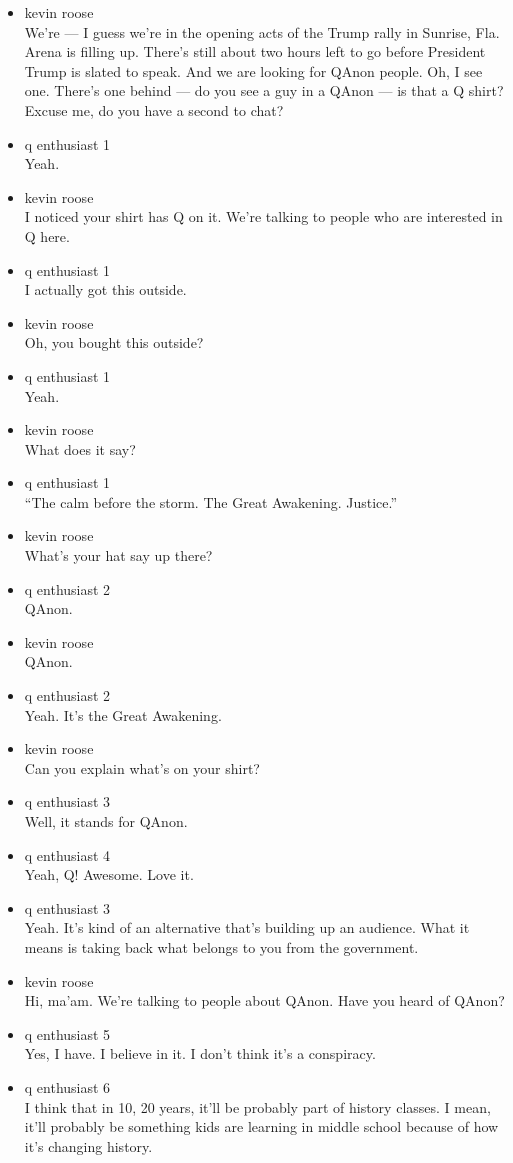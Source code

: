 \begin{itemize}
\item
  kevin roose\\
  We're --- I guess we're in the opening acts of the Trump rally in
  Sunrise, Fla. Arena is filling up. There's still about two hours left
  to go before President Trump is slated to speak. And we are looking
  for QAnon people. Oh, I see one. There's one behind --- do you see a
  guy in a QAnon --- is that a Q shirt? Excuse me, do you have a second
  to chat?
\item
  q enthusiast 1\\
  Yeah.
\item
  kevin roose\\
  I noticed your shirt has Q on it. We're talking to people who are
  interested in Q here.
\item
  q enthusiast 1\\
  I actually got this outside.
\item
  kevin roose\\
  Oh, you bought this outside?
\item
  q enthusiast 1\\
  Yeah.
\item
  kevin roose\\
  What does it say?
\item
  q enthusiast 1\\
  ``The calm before the storm. The Great Awakening. Justice.''
\item
  kevin roose\\
  What's your hat say up there?
\item
  q enthusiast 2\\
  QAnon.
\item
  kevin roose\\
  QAnon.
\item
  q enthusiast 2\\
  Yeah. It's the Great Awakening.
\item
  kevin roose\\
  Can you explain what's on your shirt?
\item
  q enthusiast 3\\
  Well, it stands for QAnon.
\item
  q enthusiast 4\\
  Yeah, Q! Awesome. Love it.
\item
  q enthusiast 3\\
  Yeah. It's kind of an alternative that's building up an audience. What
  it means is taking back what belongs to you from the government.
\item
  kevin roose\\
  Hi, ma'am. We're talking to people about QAnon. Have you heard of
  QAnon?
\item
  q enthusiast 5\\
  Yes, I have. I believe in it. I don't think it's a conspiracy.
\item
  q enthusiast 6\\
  I think that in 10, 20 years, it'll be probably part of history
  classes. I mean, it'll probably be something kids are learning in
  middle school because of how it's changing history.
\end{itemize}

